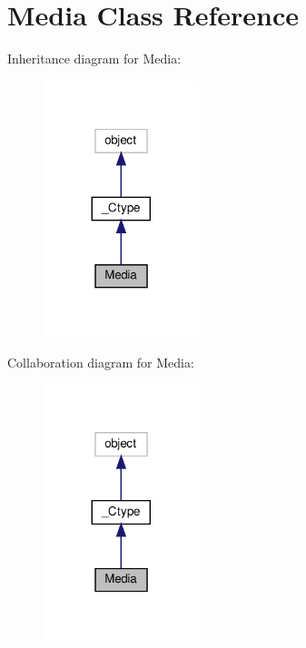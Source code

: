 \hypertarget{classvlc_1_1_media}{}\section{Media Class Reference}
\label{classvlc_1_1_media}


Inheritance diagram for Media\+:
\nopagebreak
\begin{figure}[H]
\begin{center}
\leavevmode
\includegraphics[width=128pt]{classvlc_1_1_media__inherit__graph}
\end{center}
\end{figure}


Collaboration diagram for Media\+:
\nopagebreak
\begin{figure}[H]
\begin{center}
\leavevmode
\includegraphics[width=128pt]{classvlc_1_1_media__coll__graph}
\end{center}
\end{figure}
